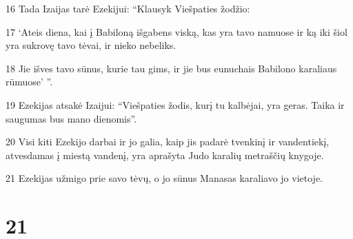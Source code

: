 \par 16 Tada Izaijas tarė Ezekijui: “Klausyk Viešpaties žodžio: 
\par 17 ‘Ateis diena, kai į Babiloną išgabens viską, kas yra tavo namuose ir ką iki šiol yra sukrovę tavo tėvai, ir nieko nebeliks. 
\par 18 Jie išves tavo sūnus, kurie tau gims, ir jie bus eunuchais Babilono karaliaus rūmuose’ ”. 
\par 19 Ezekijas atsakė Izaijui: “Viešpaties žodis, kurį tu kalbėjai, yra geras. Taika ir saugumas bus mano dienomis”. 
\par 20 Visi kiti Ezekijo darbai ir jo galia, kaip jis padarė tvenkinį ir vandentiekį, atvesdamas į miestą vandenį, yra aprašyta Judo karalių metraščių knygoje. 
\par 21 Ezekijas užmigo prie savo tėvų, o jo sūnus Manasas karaliavo jo vietoje.



\chapter{21}

